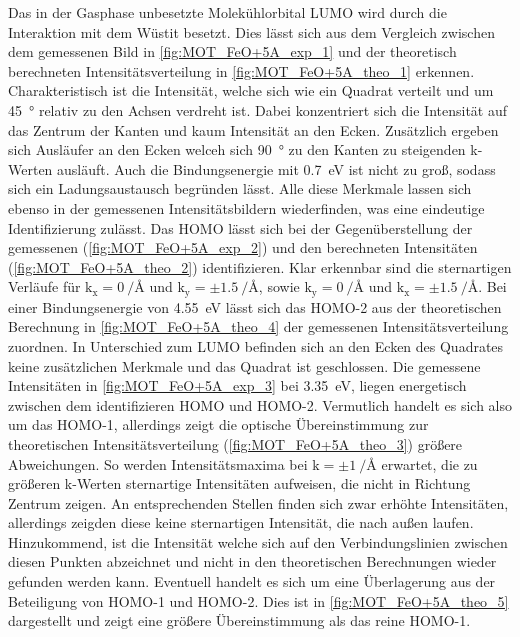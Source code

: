         Das in der Gasphase unbesetzte Molekühlorbital LUMO wird durch die Interaktion mit dem Wüstit besetzt.
        Dies lässt sich aus dem Vergleich zwischen dem gemessenen Bild in \autoref{fig:MOT_FeO+5A_exp_1} und der theoretisch berechneten Intensitätsverteilung in \autoref{fig:MOT_FeO+5A_theo_1} erkennen.
        Charakteristisch ist die Intensität, welche sich wie ein Quadrat verteilt und um \SI{45}{\degree} relativ zu den Achsen verdreht ist.
        Dabei konzentriert sich die Intensität auf das Zentrum der Kanten und kaum Intensität an den Ecken.
        Zusätzlich ergeben sich Ausläufer an den Ecken welceh sich \SI{90}{\degree} zu den Kanten zu steigenden k-Werten ausläuft.
        Auch die Bindungsenergie mit \SI{0.7}{\electronvolt} ist nicht zu groß, sodass sich ein Ladungsaustausch begründen lässt.
        Alle diese Merkmale lassen sich ebenso in der gemessenen Intensitätsbildern wiederfinden, was eine eindeutige Identifizierung zulässt.
        Das HOMO lässt sich bei der Gegenüberstellung der gemessenen (\autoref{fig:MOT_FeO+5A_exp_2}) und den berechneten Intensitäten (\autoref{fig:MOT_FeO+5A_theo_2}) identifizieren.
        Klar erkennbar sind die sternartigen Verläufe für $\text{k}_\text{x} = \SI[per-mode=reciprocal]{0}{\per\angstrom}$ und $\text{k}_\text{y} = \pm\SI[per-mode=reciprocal]{1.5}{\per\angstrom}$, sowie $\text{k}_\text{y} = \SI[per-mode=reciprocal]{0}{\per\angstrom}$ und $\text{k}_\text{x} = \pm\SI[per-mode=reciprocal]{1.5}{\per\angstrom}$.
        Bei einer Bindungsenergie von \SI{4.55}{\electronvolt} lässt sich das HOMO-2 aus der theoretischen Berechnung in \autoref{fig:MOT_FeO+5A_theo_4} der gemessenen Intensitätsverteilung zuordnen.
        In Unterschied zum LUMO befinden sich an den Ecken des Quadrates keine zusätzlichen Merkmale und das Quadrat ist geschlossen.
        Die gemessene Intensitäten in \autoref{fig:MOT_FeO+5A_exp_3} bei \SI{3.35}{\electronvolt}, liegen energetisch zwischen dem identifizieren HOMO und HOMO-2.
        Vermutlich handelt es sich also um das HOMO-1, allerdings zeigt die optische Übereinstimmung zur theoretischen Intensitätsverteilung (\autoref{fig:MOT_FeO+5A_theo_3}) größere Abweichungen.
        So werden Intensitätsmaxima bei $\text{k} = \pm\SI[per-mode=reciprocal]{1}{\per\angstrom}$ erwartet, die zu größeren k-Werten sternartige Intensitäten aufweisen, die nicht in Richtung Zentrum zeigen.
        An entsprechenden Stellen finden sich zwar erhöhte Intensitäten, allerdings zeigden diese keine sternartigen Intensität, die nach außen laufen.
        Hinzukommend, ist die Intensität welche sich auf den Verbindungslinien zwischen diesen Punkten abzeichnet und nicht in den theoretischen Berechnungen wieder gefunden werden kann.
        Eventuell handelt es sich um eine Überlagerung aus der Beteiligung von HOMO-1 und HOMO-2.
        Dies ist in \autoref{fig:MOT_FeO+5A_theo_5} dargestellt und zeigt eine größere Übereinstimmung als das reine HOMO-1.


